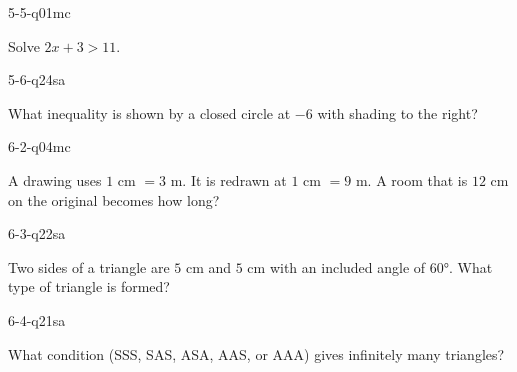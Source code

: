 \begin{practiceQuestion}{5-5-q01}{mc}
\begin{questionText}
Solve $2x + 3 > 11$.
\end{questionText}
\end{practiceQuestion}

\begin{practiceQuestion}{5-6-q24}{sa}
\begin{questionText}
What inequality is shown by a closed circle at $-6$ with shading to the right?
\end{questionText}
\end{practiceQuestion}

\begin{practiceQuestion}{6-2-q04}{mc}
\begin{questionText}
A drawing uses $1$ cm $= 3$ m. It is redrawn at $1$ cm $= 9$ m. A room that is $12$ cm on the original becomes how long?
\end{questionText}
\end{practiceQuestion}

\begin{practiceQuestion}{6-3-q22}{sa}
\begin{questionText}
Two sides of a triangle are $5$ cm and $5$ cm with an included angle of $60°$. What type of triangle is formed?
\end{questionText}
\end{practiceQuestion}

\begin{practiceQuestion}{6-4-q21}{sa}
\begin{questionText}
What condition (SSS, SAS, ASA, AAS, or AAA) gives infinitely many triangles?
\end{questionText}
\end{practiceQuestion}

